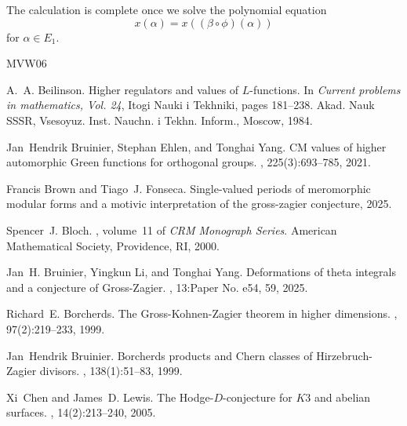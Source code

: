 \documentclass[11pt,a4paper]{article}
\begin{document}
The calculation is complete once we solve the polynomial equation
\[x(\alpha) = x((\beta \circ \phi)(\alpha))\]
for $\alpha \in E_1$. 





















\begin{thebibliography}{MVW06}

A.~A. Beilinson.
\newblock Higher regulators and values of {$L$}-functions.
\newblock In {\em Current problems in mathematics, {V}ol. 24}, Itogi Nauki i
  Tekhniki, pages 181--238. Akad. Nauk SSSR, Vsesoyuz. Inst. Nauchn. i Tekhn.
  Inform., Moscow, 1984.

Jan~Hendrik Bruinier, Stephan Ehlen, and Tonghai Yang.
\newblock C{M} values of higher automorphic {G}reen functions for orthogonal
  groups.
, 225(3):693--785, 2021.

Francis Brown and Tiago~J. Fonseca.
\newblock Single-valued periods of meromorphic modular forms and a motivic
  interpretation of the gross-zagier conjecture, 2025.

Spencer~J. Bloch.
, volume~11 of {\em CRM Monograph Series}.
\newblock American Mathematical Society, Providence, RI, 2000.

Jan~H. Bruinier, Yingkun Li, and Tonghai Yang.
\newblock Deformations of theta integrals and a conjecture of {G}ross-{Z}agier.
, 13:Paper No. e54, 59, 2025.

Richard~E. Borcherds.
\newblock The {G}ross-{K}ohnen-{Z}agier theorem in higher dimensions.
, 97(2):219--233, 1999.

Jan~Hendrik Bruinier.
\newblock Borcherds products and {C}hern classes of {H}irzebruch-{Z}agier
  divisors.
, 138(1):51--83, 1999.

Xi~Chen and James~D. Lewis.
\newblock The {H}odge-{$ D$}-conjecture for {$K3$} and abelian surfaces.
, 14(2):213--240, 2005.


\end{thebibliography}
\end{document}
